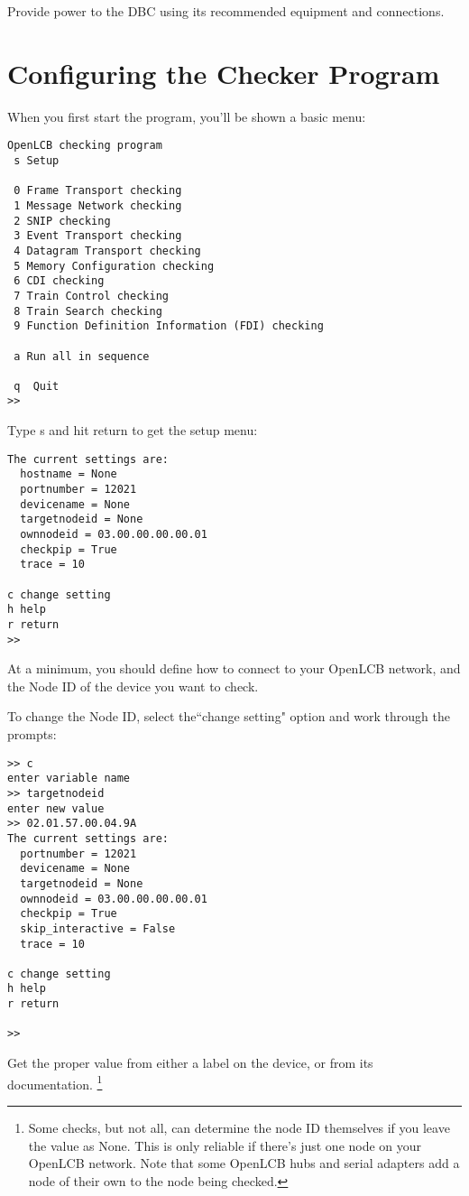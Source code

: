 Provide power to the DBC using its recommended equipment and connections.

\section{Configuring the Checker Program}

When you first start the program, you'll be shown a basic menu:

\begin{verbatim}
OpenLCB checking program
 s Setup

 0 Frame Transport checking
 1 Message Network checking
 2 SNIP checking
 3 Event Transport checking
 4 Datagram Transport checking
 5 Memory Configuration checking
 6 CDI checking
 7 Train Control checking
 8 Train Search checking
 9 Function Definition Information (FDI) checking
  
 a Run all in sequence

 q  Quit
>>
\end{verbatim}

Type s and hit return to get the setup menu:

\begin{verbatim}
The current settings are:
  hostname = None
  portnumber = 12021
  devicename = None
  targetnodeid = None
  ownnodeid = 03.00.00.00.00.01
  checkpip = True
  trace = 10

c change setting
h help
r return
>>
\end{verbatim}

At a minimum, you should define how to connect to your OpenLCB network,
and the Node ID of the device you want to check.

To change the Node ID, select the``change setting" option and work through the prompts:

\begin{verbatim}
>> c
enter variable name
>> targetnodeid
enter new value
>> 02.01.57.00.04.9A
The current settings are:
  portnumber = 12021
  devicename = None
  targetnodeid = None
  ownnodeid = 03.00.00.00.00.01
  checkpip = True
  skip_interactive = False
  trace = 10

c change setting
h help
r return

>>
\end{verbatim}

Get the proper value from either a label on the device, or from its documentation.
\footnote{Some checks, but not all, can determine the node ID themselves if you leave
    the value as None. This is only reliable if there's just one node on your OpenLCB
    network.  Note that some OpenLCB hubs and serial adapters 
    add a node of their own to the node being checked.}

